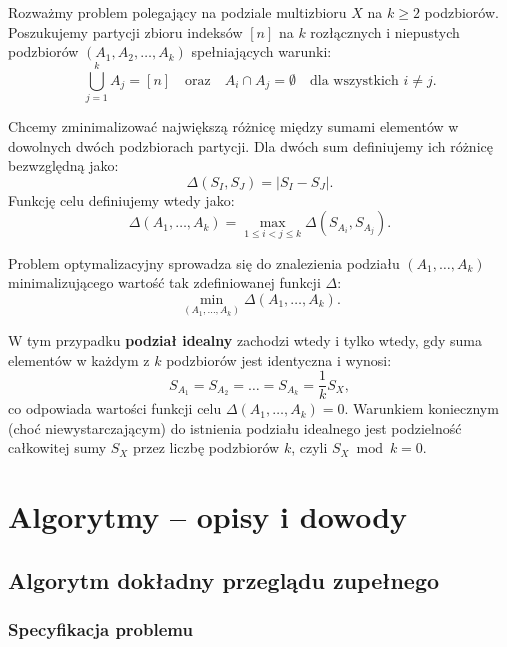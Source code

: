 \documentclass[11pt]{article}
\begin{document}
Rozważmy problem polegający na podziale multizbioru $X$ na $k \ge 2$ podzbiorów. Poszukujemy partycji zbioru indeksów $[n]$ na $k$ rozłącznych i niepustych podzbiorów $(A_1, A_2, \dots, A_k)$ spełniających warunki:
\begin{equation}
    \bigcup_{j=1}^k A_j = [n] \quad \text{oraz} \quad A_i \cap A_j = \emptyset \quad \text{dla wszystkich } i \neq j.
\end{equation}

Chcemy zminimalizować największą różnicę między sumami elementów w dowolnych dwóch podzbiorach partycji. Dla dwóch sum definiujemy ich różnicę bezwzględną jako:
\begin{equation}
    \Delta(S_I, S_J) = |S_I - S_J|.
\end{equation}
Funkcję celu definiujemy wtedy jako:
\begin{equation}
    \Delta(A_1, \dots, A_k) = \max_{1 \le i < j \le k} \Delta(S_{A_i}, S_{A_j}).
\end{equation}

Problem optymalizacyjny sprowadza się do znalezienia podziału $(A_1, \dots, A_k)$ minimalizującego wartość tak zdefiniowanej funkcji $\Delta$:
\begin{equation}
    \min_{(A_1, \dots, A_k)} \Delta(A_1, \dots, A_k).
\end{equation}

W tym przypadku \textbf{podział idealny} zachodzi wtedy i tylko wtedy, gdy suma elementów w każdym z $k$ podzbiorów jest identyczna i wynosi:
\begin{equation}
    S_{A_1} = S_{A_2} = \dots = S_{A_k} = \frac{1}{k} S_X,
\end{equation}
co odpowiada wartości funkcji celu $\Delta(A_1, \dots, A_k) = 0$. Warunkiem koniecznym (choć niewystarczającym) do istnienia podziału idealnego jest podzielność całkowitej sumy $S_X$ przez liczbę podzbiorów $k$, czyli $S_X \bmod k = 0$.

\section{Algorytmy -- opisy i dowody}

\subsection{Algorytm dokładny przeglądu zupełnego}

\subsubsection{Specyfikacja problemu}
\end{document}
